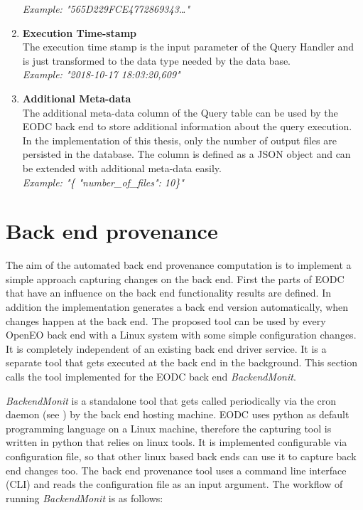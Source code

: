 \documentclass[draft,final]{vutinfth} %
\begin{document}
\begin{enumerate}
	\textit{Example: "565D229FCE4772869343\dots"} 
	\item \textbf{Execution Time-stamp} \\
	The execution time stamp is the input parameter of the Query Handler and is just transformed to the data type needed by the data base. 	\\
	\textit{Example: "2018-10-17 18:03:20,609"}  
	\item \textbf{Additional Meta-data} \\
	The additional meta-data column of the Query table can be used by the EODC back end to store additional information about the query execution. In the implementation of this thesis, only the number of output files are persisted in the database. The column is defined as a JSON object and can be extended with additional meta-data easily. \\
	\textit{Example: "\{ "number\_of\_files": 10\}"}    	 
\end{enumerate}

\section{Back end provenance}\label{Implementation:Back end provenance}
The aim of the automated back end provenance computation is to implement a simple approach capturing changes on the back end. First the parts of EODC that have an influence on the back end functionality results are defined. In addition the implementation generates a back end version automatically, when changes happen at the back end. The proposed tool can be used by every OpenEO back end with a Linux system with some simple configuration changes. It is completely independent of an existing back end driver service. It is a separate tool that gets executed at the back end in the background. This section calls the tool implemented for the EODC back end \textit{BackendMonit}. 

\textit{BackendMonit} is a standalone tool that gets called periodically via the cron daemon (see \cite{crontab}) by the back end hosting machine. EODC uses python as default programming language on a Linux machine, therefore the capturing tool is written in python that relies on linux tools. It is implemented configurable via configuration file, so that other linux based back ends can use it to capture back end changes too. The back end provenance tool uses a command line interface (CLI) and reads the configuration file as an input argument. 
The workflow of running \textit{BackendMonit} is as follows: 
\end{document}
